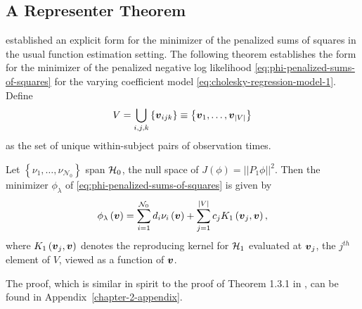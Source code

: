 

\subsection{A Representer Theorem}

\cite{wahba1990spline} established an explicit form for the minimizer of the penalized sums of squares in the usual function estimation setting. The following theorem establishes the form for the minimizer of the penalized negative log likelihood \eqref{eq:phi-penalized-sums-of-squares} for the varying coefficient model \eqref{eq:cholesky-regression-model-1}. Define  
\[
V = \bigcup\limits_{i,j,k} \left\{\mbox{\boldmath $v$}_{ijk} \right\} \equiv \left\{ \mbox{\boldmath $v$}_1,\dots,\mbox{\boldmath $v$}_{\vert V \vert} \right\}
\]
\noindent
as the set of unique within-subject pairs of observation times. 

 \begin{theorem} \label{theorem:finite-dimensional-minimizer}
 Let $\left\{\nu_1,\dots, \nu_{\mathcal{N}_0}\right\}$ span $\mathcal{H}_0$, the null space of $J\left(\phi\right) = \vert \vert P_1 \phi\vert\vert^2$. Then the minimizer $\phi_\lambda$ of \eqref{eq:phi-penalized-sums-of-squares} is given by
 \begin{equation} \label{eq:form-of-the-minimizer-phi}
\phi_\lambda\left(\mbox{\boldmath $v$}\right) = \sum_{i = 1}^{\mathcal{N}_0} d_i \nu_{i}\left(\mbox{\boldmath $v$}\right) + \sum_{j = 1}^{\vert V \vert} c_j K_1\left(\mbox{\boldmath $v$}_j, \mbox{\boldmath $v$}\right),
\end{equation}
\noindent
where $K_1\left(\mbox{\boldmath $v$}_j, \mbox{\boldmath $v$} \right)$ denotes the reproducing kernel for $\mathcal{H}_1$ evaluated at ${\mbox{\boldmath $v$}_j}$, the $j^{th}$ element of $V$, viewed as a function of $\mbox{\boldmath $v$}$.
\end{theorem}
\vspace{0.5cm}
\noindent
The proof, which is similar in spirit to the proof of Theorem 1.3.1 in \cite{wahba1990spline}, can be found in Appendix~\ref{chapter-2-appendix}.



